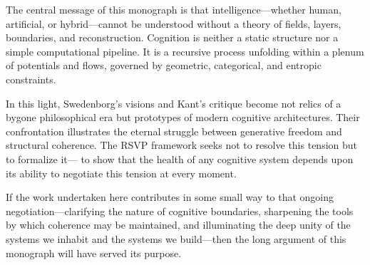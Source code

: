 \documentclass[12pt]{article}
\begin{document}
The central message of this monograph is that intelligence—whether human, 
artificial, or hybrid—cannot be understood without a theory of fields, 
layers, boundaries, and reconstruction.  
Cognition is neither a static structure nor a simple computational pipeline.  
It is a recursive process unfolding within a plenum of potentials and flows, 
governed by geometric, categorical, and entropic constraints.

In this light, Swedenborg’s visions and Kant’s critique become not relics of 
a bygone philosophical era but prototypes of modern cognitive architectures.  
Their confrontation illustrates the eternal struggle between generative 
freedom and structural coherence.  
The RSVP framework seeks not to resolve this tension but to formalize it—  
to show that the health of any cognitive system depends upon its ability to 
negotiate this tension at every moment.

If the work undertaken here contributes in some small way to that ongoing 
negotiation—clarifying the nature of cognitive boundaries, sharpening the 
tools by which coherence may be maintained, and illuminating the deep unity 
of the systems we inhabit and the systems we build—then the long argument of 
this monograph will have served its purpose.
\end{document}
